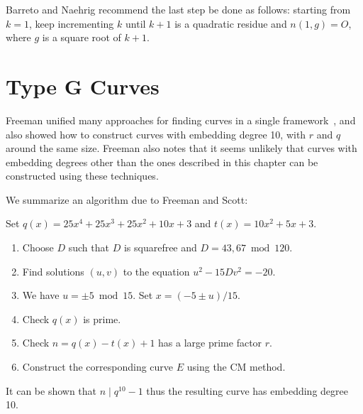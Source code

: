Barreto and Naehrig recommend the last step be done as follows:
starting from $k = 1$, keep incrementing $k$ until $k+1$ is a quadratic
residue and $n(1,g) = O$, where $g$ is a square root of $k + 1$.

\section {Type G Curves}

Freeman unified many approaches for finding curves in a single
framework~\cite{freeman06}, and also showed how to construct curves with
embedding degree 10, with $r$ and $q$ around the same size.
Freeman also notes that it seems unlikely that curves
with embedding degrees other than the ones described in this chapter
can be constructed using these techniques.

We summarize an algorithm due to Freeman and Scott:

Set $q(x) = 25x^4 + 25x^3 + 25x^2 + 10x + 3$ and
$t(x) = 10x^2 + 5x + 3$.

\begin{enumerate}
\item
Choose $D$ such that $D$ is squarefree and $D = 43, 67 \bmod 120$.
\item
Find solutions $(u,v)$ to the equation $u^2 - 15 Dv^2 = -20$.
\item
We have $u = \pm 5 \bmod 15$.
Set $x = (-5 \pm u)/15$.
\item
Check $q(x)$ is prime.
\item
Check $n = q(x) - t(x) + 1$ has a large prime factor $r$.
\item
Construct the corresponding curve $E$ using the CM method.
\end{enumerate}

It can be shown that $n \mid q^{10} - 1$ thus the resulting curve has
embedding degree 10.

